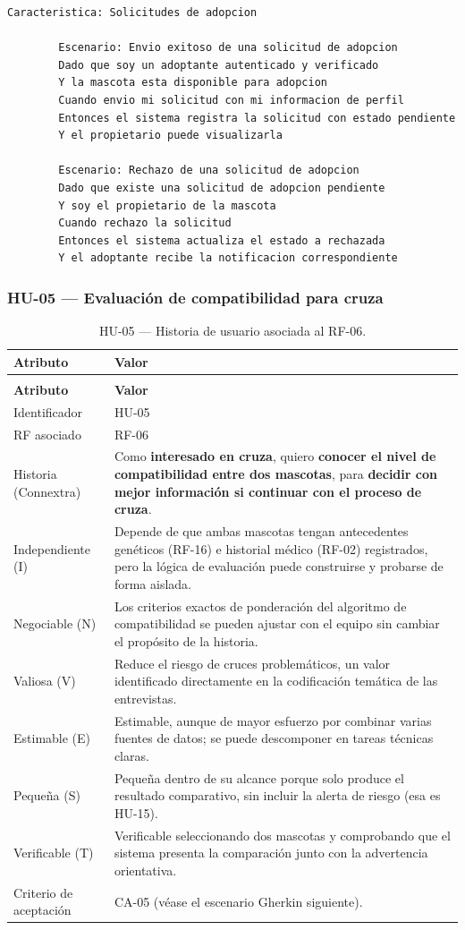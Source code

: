 \documentclass[journal,onecolumn]{IEEEtran}
\makeatletter
\newenvironment{atributos}[2]{%
	\small
	\begin{longtable}{@{}>{\raggedright\arraybackslash}p{4.2cm} >{\raggedright\arraybackslash}p{11.2cm}@{}}
		\caption{#2}\label{tab:#1}\\
		\toprule
		\textbf{Atributo} & \textbf{Valor} \\
		\midrule
		\endfirsthead
		\multicolumn{2}{@{}l}{\small\itshape (continuación)}\\
		\toprule
		\textbf{Atributo} & \textbf{Valor} \\
		\midrule
		\endhead
		\bottomrule
		\endlastfoot
	}{%
	\end{longtable}
	\normalsize
}
\makeatother
\begin{document}
	\begin{lstlisting}[style=gherkin,caption={CA-04 --- Escenario de aceptación de la historia HU-04.},label={lst:ca04}]
		Caracteristica: Solicitudes de adopcion
		
		Escenario: Envio exitoso de una solicitud de adopcion
		Dado que soy un adoptante autenticado y verificado
		Y la mascota esta disponible para adopcion
		Cuando envio mi solicitud con mi informacion de perfil
		Entonces el sistema registra la solicitud con estado pendiente
		Y el propietario puede visualizarla
		
		Escenario: Rechazo de una solicitud de adopcion
		Dado que existe una solicitud de adopcion pendiente
		Y soy el propietario de la mascota
		Cuando rechazo la solicitud
		Entonces el sistema actualiza el estado a rechazada
		Y el adoptante recibe la notificacion correspondiente
	\end{lstlisting}
	
	\subsubsection{HU-05 --- Evaluación de compatibilidad para cruza}
	
	\begin{atributos}{HU-05}{HU-05 --- Historia de usuario asociada al RF-06.}
		Identificador & HU-05 \\
		RF asociado & RF-06 \\
		Historia (Connextra) & Como \textbf{interesado en cruza}, quiero \textbf{conocer el nivel de compatibilidad entre dos mascotas}, para \textbf{decidir con mejor información si continuar con el proceso de cruza}. \\
		Independiente (I) & Depende de que ambas mascotas tengan antecedentes genéticos (RF-16) e historial médico (RF-02) registrados, pero la lógica de evaluación puede construirse y probarse de forma aislada. \\
		Negociable (N) & Los criterios exactos de ponderación del algoritmo de compatibilidad se pueden ajustar con el equipo sin cambiar el propósito de la historia. \\
		Valiosa (V) & Reduce el riesgo de cruces problemáticos, un valor identificado directamente en la codificación temática de las entrevistas. \\
		Estimable (E) & Estimable, aunque de mayor esfuerzo por combinar varias fuentes de datos; se puede descomponer en tareas técnicas claras. \\
		Pequeña (S) & Pequeña dentro de su alcance porque solo produce el resultado comparativo, sin incluir la alerta de riesgo (esa es HU-15). \\
		Verificable (T) & Verificable seleccionando dos mascotas y comprobando que el sistema presenta la comparación junto con la advertencia orientativa. \\
		Criterio de aceptación & CA-05 (véase el escenario Gherkin siguiente). \\
	\end{atributos}
	
\end{document}
